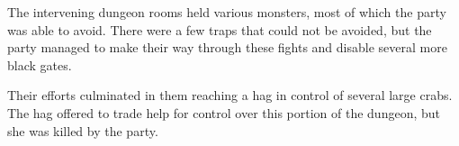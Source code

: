 The intervening dungeon rooms held various monsters, most of which the party was able to avoid.
There were a few traps that could not be avoided, but the party managed to make their way through these fights and disable several more black gates.

Their efforts culminated in them reaching a hag in control of several large crabs.
The hag offered to trade help for control over this portion of the dungeon, but she was killed by the party.
